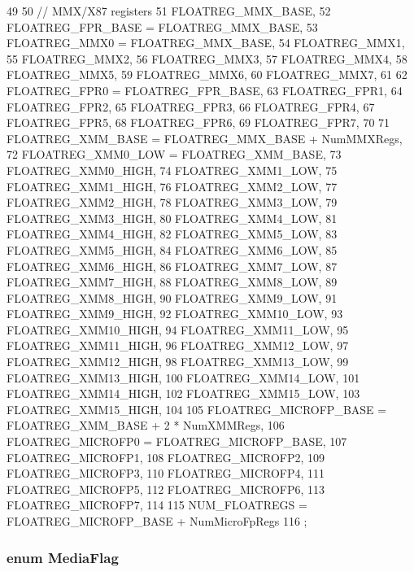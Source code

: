 \begin{DoxyCode}
49     {
50         // MMX/X87 registers
51         FLOATREG_MMX_BASE,
52         FLOATREG_FPR_BASE = FLOATREG_MMX_BASE,
53         FLOATREG_MMX0 = FLOATREG_MMX_BASE,
54         FLOATREG_MMX1,
55         FLOATREG_MMX2,
56         FLOATREG_MMX3,
57         FLOATREG_MMX4,
58         FLOATREG_MMX5,
59         FLOATREG_MMX6,
60         FLOATREG_MMX7,
61 
62         FLOATREG_FPR0 = FLOATREG_FPR_BASE,
63         FLOATREG_FPR1,
64         FLOATREG_FPR2,
65         FLOATREG_FPR3,
66         FLOATREG_FPR4,
67         FLOATREG_FPR5,
68         FLOATREG_FPR6,
69         FLOATREG_FPR7,
70 
71         FLOATREG_XMM_BASE = FLOATREG_MMX_BASE + NumMMXRegs,
72         FLOATREG_XMM0_LOW = FLOATREG_XMM_BASE,
73         FLOATREG_XMM0_HIGH,
74         FLOATREG_XMM1_LOW,
75         FLOATREG_XMM1_HIGH,
76         FLOATREG_XMM2_LOW,
77         FLOATREG_XMM2_HIGH,
78         FLOATREG_XMM3_LOW,
79         FLOATREG_XMM3_HIGH,
80         FLOATREG_XMM4_LOW,
81         FLOATREG_XMM4_HIGH,
82         FLOATREG_XMM5_LOW,
83         FLOATREG_XMM5_HIGH,
84         FLOATREG_XMM6_LOW,
85         FLOATREG_XMM6_HIGH,
86         FLOATREG_XMM7_LOW,
87         FLOATREG_XMM7_HIGH,
88         FLOATREG_XMM8_LOW,
89         FLOATREG_XMM8_HIGH,
90         FLOATREG_XMM9_LOW,
91         FLOATREG_XMM9_HIGH,
92         FLOATREG_XMM10_LOW,
93         FLOATREG_XMM10_HIGH,
94         FLOATREG_XMM11_LOW,
95         FLOATREG_XMM11_HIGH,
96         FLOATREG_XMM12_LOW,
97         FLOATREG_XMM12_HIGH,
98         FLOATREG_XMM13_LOW,
99         FLOATREG_XMM13_HIGH,
100         FLOATREG_XMM14_LOW,
101         FLOATREG_XMM14_HIGH,
102         FLOATREG_XMM15_LOW,
103         FLOATREG_XMM15_HIGH,
104 
105         FLOATREG_MICROFP_BASE = FLOATREG_XMM_BASE + 2 * NumXMMRegs,
106         FLOATREG_MICROFP0 = FLOATREG_MICROFP_BASE,
107         FLOATREG_MICROFP1,
108         FLOATREG_MICROFP2,
109         FLOATREG_MICROFP3,
110         FLOATREG_MICROFP4,
111         FLOATREG_MICROFP5,
112         FLOATREG_MICROFP6,
113         FLOATREG_MICROFP7,
114 
115         NUM_FLOATREGS = FLOATREG_MICROFP_BASE + NumMicroFpRegs
116     };
\end{DoxyCode}
\hypertarget{namespaceX86ISA_a8983ba7d9e44eff3c164c601a45806b7}{
\subsubsection[{MediaFlag}]{\setlength{\rightskip}{0pt plus 5cm}enum {\bf MediaFlag}}}
